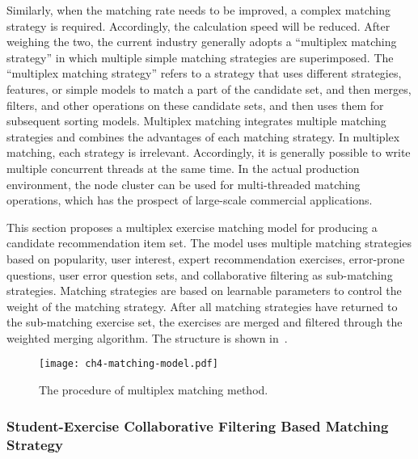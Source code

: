 Similarly, when the matching rate needs to be improved, a complex matching strategy is required. Accordingly, the calculation speed will be reduced. After weighing the two, the current industry generally adopts a ``multiplex matching strategy'' in which multiple simple matching strategies are superimposed. The ``multiplex matching strategy'' refers to a strategy that uses different strategies, features, or simple models to match a part of the candidate set, and then merges, filters, and other operations on these candidate sets, and then uses them for subsequent sorting models. Multiplex matching integrates multiple matching strategies and combines the advantages of each matching strategy. In multiplex matching, each strategy is irrelevant. Accordingly, it is generally possible to write multiple concurrent threads at the same time. In the actual production environment, the node cluster can be used for multi-threaded matching operations, which has the prospect of large-scale commercial applications.

This section proposes a multiplex exercise matching model for producing a candidate recommendation item set. The model uses multiple matching strategies based on popularity, user interest, expert recommendation exercises, error-prone questions, user error question sets, and collaborative filtering as sub-matching strategies. Matching strategies are based on learnable parameters to control the weight of the matching strategy. After all matching strategies have returned to the sub-matching exercise set, the exercises are merged and filtered through the weighted merging algorithm. The structure is shown in~\figname{\ref{fig:ch4-matching}}.

\begin{figure}[htbp!]
    \centering
    \texttt{[image: ch4-matching-model.pdf]}
    \caption{The procedure of multiplex matching method.}\label{fig:ch4-matching}
\end{figure}

\subsubsection{Student-Exercise Collaborative Filtering Based Matching Strategy}

